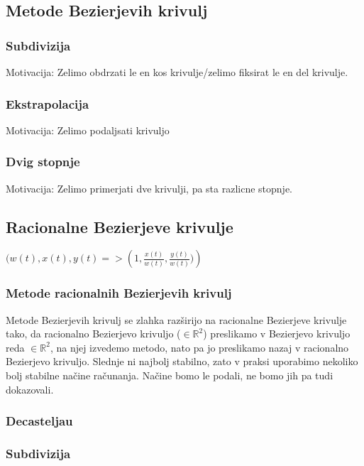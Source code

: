 \documentclass[isrm2, tisk]{fmfdelo}
\newcommand{\R}{\mathbb R}
\begin{document}
    \subsection{Metode Bezierjevih krivulj}

    \subsubsection{Subdivizija}
    Motivacija: Zelimo obdrzati le en kos krivulje/zelimo fiksirat le en del krivulje.

    \subsubsection{Ekstrapolacija}
    Motivacija: Zelimo podaljsati krivuljo

    \subsubsection{Dvig stopnje}
    Motivacija: Zelimo primerjati dve krivulji, pa sta razlicne stopnje.

    \subsection{Racionalne Bezierjeve krivulje}


    $(w(t),x(t),y(t) => \left(1,\frac{x(t)}{w(t)},\frac{y(t)}{w(t)})\right)$

    \subsubsection{Metode racionalnih Bezierjevih krivulj}
    Metode Bezierjevih krivulj se zlahka razširijo na racionalne Bezierjeve krivulje tako, da racionalno Bezierjevo krivuljo ($\in\R^2$) preslikamo v Bezierjevo krivuljo reda $\in\R^2$, na njej izvedemo metodo, nato pa jo preslikamo nazaj v racionalno Bezierjevo krivuljo. Slednje ni najbolj stabilno, zato v praksi uporabimo nekoliko bolj stabilne načine računanja. Načine bomo le podali, ne bomo jih pa tudi dokazovali.

    \subsubsection{Decasteljau}

    \subsubsection{Subdivizija}
\end{document}
